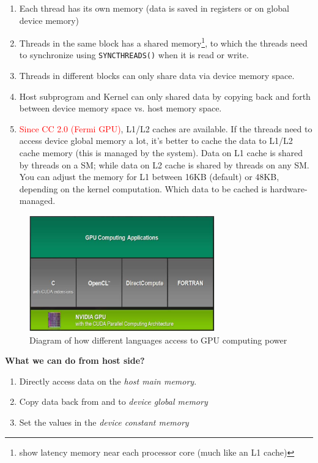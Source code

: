 \begin{enumerate}
\item Each thread has its own memory (data is saved in registers or on
  global device memory)

\item Threads in the same block has a shared
  memory\footnote{show latency memory near each processor core (much
    like an L1 cache)},
  to which the threads need to synchronize using \verb!SYNCTHREADS()!
  when it is read or write.

\item Threads in different blocks can only share data via device
  memory space. 

\item Host subprogram and Kernel can only shared data by copying back
  and forth between device memory space vs. host memory space.

\item \textcolor{red}{Since CC 2.0 (Fermi GPU)}, L1/L2 caches are
  available. If the threads need to access device global memory a lot,
  it's better to cache the data to L1/L2 cache memory (this is managed
  by the system). Data on L1 cache is shared by threads on a SM; while
  data on L2 cache is shared by threads on any SM. You can adjust the
  memory for L1 between 16KB (default) or 48KB, depending on the
  kernel computation. Which data to be cached is hardware-managed.
\end{enumerate}

\begin{figure}[hbt]
  \centerline{\includegraphics[height=5cm,
    angle=0]{./images/cuda_gpu.eps}}
  \caption{Diagram of how different languages access to GPU computing
    power}
  \label{fig:cuda_gpu}
\end{figure}

{\bf What we can do from host side?}
\begin{enumerate}
\item Directly access data on the {\it host main memory}.
\item Copy data back from and to {\it device global memory}
\item Set the values in the {\it device constant memory}
\end{enumerate}

